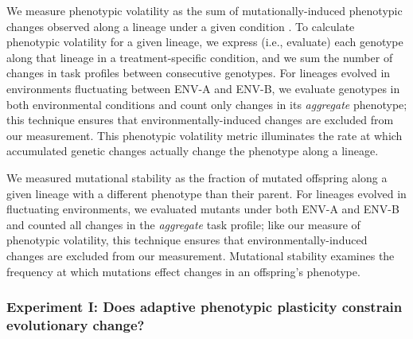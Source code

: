 
We measure phenotypic volatility as the sum of mutationally-induced phenotypic changes observed along a lineage under a given condition \citep{dolson_interpreting_2020}.
To calculate phenotypic volatility for a given lineage, we express (i.e., evaluate) each genotype along that lineage in a treatment-specific condition, and we sum the number of changes in task profiles between consecutive genotypes.
For lineages evolved in environments fluctuating between ENV-A and ENV-B, we evaluate genotypes in both environmental conditions and count only changes in its \textit{aggregate} phenotype; this technique ensures that environmentally-induced changes are excluded from our measurement.
This phenotypic volatility metric illuminates the rate at which accumulated genetic changes actually change the phenotype along a lineage. %

We measured mutational stability as the fraction of mutated offspring along a given lineage with a different phenotype than their parent.
For lineages evolved in fluctuating environments, we evaluated mutants under both ENV-A and ENV-B and counted all changes in the \textit{aggregate} task profile; like our measure of phenotypic volatility, this technique ensures that environmentally-induced changes are excluded from our measurement.
Mutational stability examines the frequency at which mutations effect changes in an offspring's phenotype.

\vspace{1cm}
\subsubsection{Experiment I: Does adaptive phenotypic plasticity constrain evolutionary change?}
\label{sec:methods:experiment-evolutionary-dynamics}

